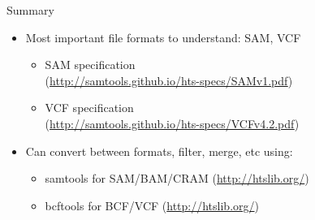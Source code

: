 \documentclass{beamer}
\begin{document}
\begin{frame}{Summary}

  \begin{itemize}
  \item
    Most important file formats to understand: SAM, VCF
    \begin{itemize}
    \item SAM specification \\
    (\url{http://samtools.github.io/hts-specs/SAMv1.pdf})
    \item VCF specification \\
    (\url{http://samtools.github.io/hts-specs/VCFv4.2.pdf})
    \end{itemize}
  \item
    Can convert between formats, filter, merge, etc using:
    \begin{itemize}
    \item samtools for SAM/BAM/CRAM (\url{http://htslib.org/})
    \item bcftools for BCF/VCF (\url{http://htslib.org/})
    \end{itemize}
  \end{itemize}

\end{frame}
\end{document}
